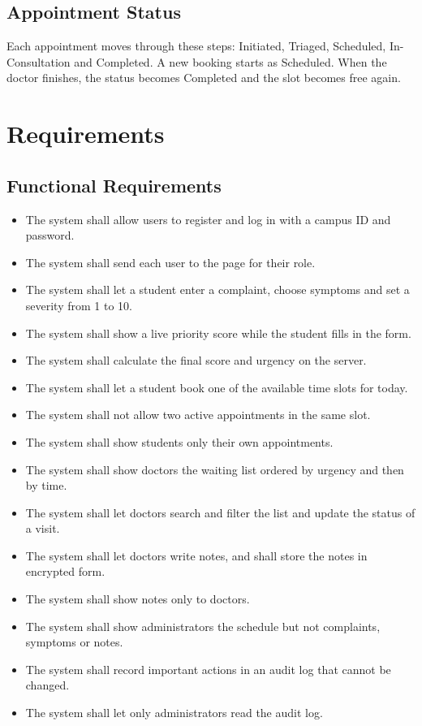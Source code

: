 \documentclass[12pt,a4paper]{article}
\begin{document}
\subsection{Appointment Status}
Each appointment moves through these steps: Initiated, Triaged, Scheduled, In-Consultation and Completed. A new booking starts as Scheduled. When the doctor finishes, the status becomes Completed and the slot becomes free again.

\section{Requirements}

\subsection{Functional Requirements}
\begin{itemize}
  \item The system shall allow users to register and log in with a campus ID and password.
  \item The system shall send each user to the page for their role.
  \item The system shall let a student enter a complaint, choose symptoms and set a severity from 1 to 10.
  \item The system shall show a live priority score while the student fills in the form.
  \item The system shall calculate the final score and urgency on the server.
  \item The system shall let a student book one of the available time slots for today.
  \item The system shall not allow two active appointments in the same slot.
  \item The system shall show students only their own appointments.
  \item The system shall show doctors the waiting list ordered by urgency and then by time.
  \item The system shall let doctors search and filter the list and update the status of a visit.
  \item The system shall let doctors write notes, and shall store the notes in encrypted form.
  \item The system shall show notes only to doctors.
  \item The system shall show administrators the schedule but not complaints, symptoms or notes.
  \item The system shall record important actions in an audit log that cannot be changed.
  \item The system shall let only administrators read the audit log.
\end{itemize}
\end{document}
